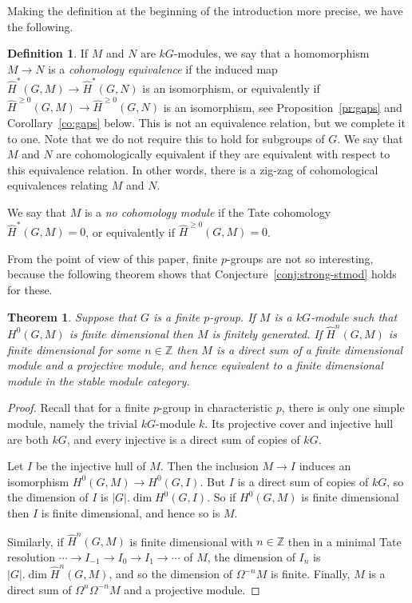 \documentclass[12pt]{amsart}
\newcommand{\kG}{\kk G}
\newcommand{\kk}{k}
\newcommand{\bZ}{\mathbb Z}
\renewcommand{\ge}{\geqslant}
\numberwithin{equation}{section}
\theoremstyle{plain}
\newtheorem{theorem}[equation]{Theorem}
\theoremstyle{definition}
\newtheorem{definition}[equation]{Definition}
\theoremstyle{remark}
\begin{document}
Making the definition at the beginning of the introduction more
precise, we have the following.

\begin{definition}
If
$M$ and $N$ are $\kG$-modules, we say that a homomorphism $M \to N$ is
a \emph{cohomology equivalence} if the induced map $\hat H^*(G,M) \to
\hat H^*(G,N)$ is an isomorphism, or equivalently if
$\hat H^{\ge 0}(G,M) \to \hat H^{\ge 0}(G,N)$ is an isomorphism, see
Proposition~\ref{pr:gaps} and Corollary~\ref{co:gaps} below. This is
not an equivalence relation, but we complete it to one.
Note that we do not require this to hold
for subgroups of $G$. We say that $M$ and $N$ are cohomologically
equivalent if they are equivalent with respect to this equivalence
relation. In other words, there is a zig-zag of cohomological
equivalences relating $M$ and $N$.

We say that $M$ is a \emph{no cohomology module}
if the Tate cohomology $\hat H^*(G,M)=0$, or equivalently if
$\hat H^{\ge 0}(G,M)=0$.
\end{definition}

From the point of view of this paper, finite $p$-groups are not so
interesting, because the following theorem shows that
Conjecture~\ref{conj:strong-stmod} holds for these.

\begin{theorem}\label{th:p-group-stmod}
Suppose that $G$ is a finite $p$-group. If $M$ is a $\kG$-module such
that $H^0(G,M)$ is finite dimensional
then $M$ is finitely generated. If $\hat H^n(G,M)$ is finite dimensional
for some $n\in\bZ$
then $M$ is a direct sum of a finite dimensional module and a
projective module, and hence equivalent to a finite dimensional module
in the stable module category.
\end{theorem}
\begin{proof}
Recall that for a finite $p$-group in characteristic $p$, there is
only one simple module, namely the trivial $\kG$-module $\kk$.
Its projective cover and injective hull are both $\kG$, and every
injective is a direct sum of copies of $\kG$.

Let $I$ be the injective hull of $M$. Then the inclusion $M \to I$
induces an isomorphism $H^0(G,M) \to H^0(G,I)$. But $I$ is a direct
sum of copies of $\kG$, so the dimension of $I$ is $|G|.\dim H^0(G,I)$.
So if $H^0(G,M)$ is finite dimensional then $I$ is finite dimensional, and hence so is $M$.

Similarly, if $\hat H^n(G,M)$ is finite dimensional with $n\in\bZ$ then in 
a minimal Tate resolution $\cdots \to I_{-1} \to I_0 \to I_1\to \cdots$ of $M$, 
the dimension of $I_n$ is $|G|.\dim\hat H^n(G,M)$, and so the
dimension of $\Omega^{-n}M$ is finite. Finally, $M$ is a direct sum of
$\Omega^n\Omega^{-n}M$ and a projective module.
\end{proof}
\end{document}

